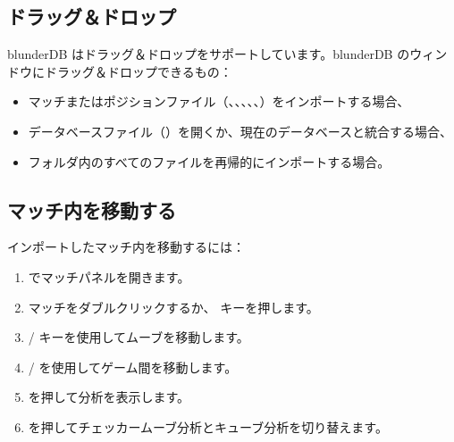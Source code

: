 \documentclass[letterpaper,10pt,dvipdfmx]{sphinxmanual}
\begin{document}
\subsection{ドラッグ＆ドロップ}
\label{\detokenize{guide_utilisateur:glisser-deposer}}
\sphinxAtStartPar
blunderDB はドラッグ＆ドロップをサポートしています。blunderDB のウィンドウにドラッグ＆ドロップできるもの：
\begin{itemize}
\item {} 
\sphinxAtStartPar
マッチまたはポジションファイル（、、、、、）をインポートする場合、

\item {} 
\sphinxAtStartPar
データベースファイル（）を開くか、現在のデータベースと統合する場合、

\item {} 
\sphinxAtStartPar
フォルダ内のすべてのファイルを再帰的にインポートする場合。

\end{itemize}


\subsection{マッチ内を移動する}
\label{\detokenize{guide_utilisateur:naviguer-dans-un-match}}
\sphinxAtStartPar
インポートしたマッチ内を移動するには：
\begin{enumerate}
%
\item {} 
\sphinxAtStartPar
{} でマッチパネルを開きます。

\item {} 
\sphinxAtStartPar
マッチをダブルクリックするか、 キーを押します。

\item {} 
\sphinxAtStartPar
{} /  キーを使用してムーブを移動します。

\item {} 
\sphinxAtStartPar
{} /  を使用してゲーム間を移動します。

\item {} 
\sphinxAtStartPar
{} を押して分析を表示します。

\item {} 
\sphinxAtStartPar
{} を押してチェッカームーブ分析とキューブ分析を切り替えます。

\end{enumerate}
\end{document}

